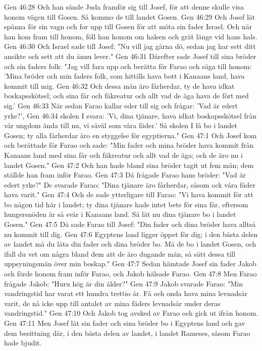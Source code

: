 Gen 46:28  Och han sände Juda framför sig till Josef, för att denne skulle visa honom vägen till Gosen. Så kommo de till landet Gosen.
Gen 46:29  Och Josef lät spänna för sin vagn och for upp till Gosen för att möta sin fader Israel. Och när han kom fram till honom, föll han honom om halsen och grät länge vid hans hals.
Gen 46:30  Och Israel sade till Josef: "Nu vill jag gärna dö, sedan jag har sett ditt ansikte och sett att du ännu lever."
Gen 46:31  Därefter sade Josef till sina bröder och sin faders folk: "Jag vill fara upp och berätta för Farao och säga till honom: 'Mina bröder och min faders folk, som hittills hava bott i Kanaans land, hava kommit till mig.
Gen 46:32  Och dessa män äro fårherdar, ty de hava idkat boskapsskötsel; och sina får och fäkreatur och allt vad de äga hava de fört med sig.'
Gen 46:33  När sedan Farao kallar eder till sig och frågar: 'Vad är edert yrke?',
Gen 46:34  skolen I svara: 'Vi, dina tjänare, hava idkat boskapsskötsel från vår ungdom ända till nu, vi såväl som våra fäder.' Så skolen I få bo i landet Gosen; ty alla fårherdar äro en styggelse för egyptierna."
Gen 47:1  Och Josef kom och berättade för Farao och sade: "Min fader och mina bröder hava kommit från Kanaans land med sina får och fäkreatur och allt vad de äga; och de äro nu i landet Gosen."
Gen 47:2  Och han hade bland sina bröder tagit ut fem män; dem ställde han fram inför Farao.
Gen 47:3  Då frågade Farao hans bröder: "Vad är edert yrke?" De svarade Farao: "Dina tjänare äro fårherdar, såsom ock våra fäder hava varit."
Gen 47:4  Och de sade ytterligare till Farao: "Vi hava kommit för att bo någon tid här i landet; ty dina tjänare hade intet bete för sina får, eftersom hungersnöden är så svår i Kanaans land. Så låt nu dina tjänare bo i landet Gosen."
Gen 47:5  Då sade Farao till Josef: "Din fader och dina bröder hava alltså nu kommit till dig.
Gen 47:6  Egyptens land ligger öppet för dig; i den bästa delen av landet må du låta din fader och dina bröder bo. Må de bo i landet Gosen, och ifall du vet om några bland dem att de äro dugande män, så sätt dessa till uppsyningsmän över min boskap."
Gen 47:7  Sedan hämtade Josef sin fader Jakob och förde honom fram inför Farao, och Jakob hälsade Farao.
Gen 47:8  Men Farao frågade Jakob: "Huru hög är din ålder?"
Gen 47:9  Jakob svarade Farao: "Min vandringstid har varat ett hundra trettio år. Få och onda hava mina levnadsår varit, de nå icke upp till antalet av mina fäders levnadsår under deras vandringstid."
Gen 47:10  Och Jakob tog avsked av Farao och gick ut ifrån honom.
Gen 47:11  Men Josef lät sin fader och sina bröder bo i Egyptens land och gav dem besittning där, i den bästa delen av landet, i landet Rameses, såsom Farao hade bjudit.
